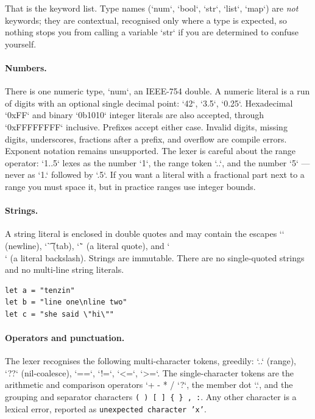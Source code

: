 \noindent
That is the keyword list. Type names (`num`, `bool`,
`str`, `list`, `map`) are \emph{not} keywords; they are contextual, recognised
only where a type is expected, so nothing stops you from calling a variable
`str` if you are determined to confuse yourself.

\paragraph{Numbers.} There is one numeric type, `num`, an IEEE-754 double.
A numeric literal is a run of digits with an optional single decimal point:
`42`, `3.5`, `0.25`. Hexadecimal `0xFF` and binary `0b1010` integer literals are also
accepted, through `0xFFFFFFFF` inclusive. Prefixes accept either case.
Invalid digits, missing digits, underscores, fractions after a prefix, and
overflow are compile errors. Exponent notation remains unsupported. The lexer is careful about the range operator: `1..5` lexes
as the number `1`, the range token `..`, and the number `5` --- never as `1.`
followed by `.5`. If you want a literal with a fractional part next to a
range you must space it, but in practice ranges use integer bounds.

\paragraph{Strings.} A string literal is enclosed in double quotes and may
contain the escapes `\n` (newline), `\t` (tab), `\"` (a literal quote), and
`\\` (a literal backslash). Strings are immutable. There are no single-quoted
strings and no multi-line string literals.

\begin{lstlisting}[language=wick]
let a = "tenzin"
let b = "line one\nline two"
let c = "she said \"hi\""
\end{lstlisting}

\paragraph{Operators and punctuation.} The lexer recognises the following
multi-character tokens, greedily: `..` (range), `??` (nil-coalesce), `==`,
`!=`, `<=`, `>=`. The single-character tokens are the arithmetic and
comparison operators `+ - * / %
`?`, the member dot `.`, and the grouping and separator characters
\texttt{( ) [ ] \{ \} , :}. Any other character is a lexical error,
reported as \texttt{unexpected character 'x'}.

